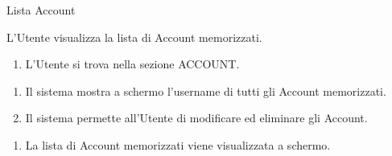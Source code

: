 {\ucTable	%
	{	%
		Lista Account
		
	}{	%
		
	}{	%
		L'Utente visualizza la lista di Account memorizzati.
		
	}{	%
		\attori
		
	}{	%
		\begin{enumerate}
			\item L'Utente si trova nella sezione ACCOUNT.
		\end{enumerate}
		
	}{	%
		\begin{enumerate}
			\item Il sistema mostra a schermo l'username di tutti gli Account memorizzati.
            \item Il sistema permette all'Utente di modificare ed eliminare gli Account.
		\end{enumerate}
		
	}{	%
		\begin{enumerate}
			\item La lista di Account memorizzati viene visualizzata a schermo.
		\end{enumerate}
		
	}{	%
} }


